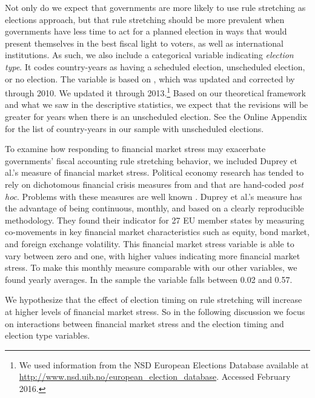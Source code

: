 \documentclass[]{article}
\begin{document}
Not only do we expect that governments are more likely to use rule stretching as elections approach, but that rule stretching should be more prevalent when governments have less time to act for a planned election in ways that would present themselves in the best fiscal light to voters, as well as international institutions. As such, we also include a categorical variable indicating \emph{election type}. It codes country-years as having a scheduled election, unscheduled election, or no election. The variable is based on \cite{Brender2008}, which was updated and corrected by \cite{hallerbergWehner2015} through 2010. We updated it through 2013.\footnote{We used information from the NSD European Elections Database available at \url{http://www.nsd.uib.no/european_election_database}. Accessed February 2016.} Based on our theoretical framework and what we saw in the descriptive statistics, we expect that the revisions will be greater for years when there is an unscheduled election. See the Online Appendix for the list of country-years in our sample with unscheduled elections.

To examine how responding to financial market stress may exacerbate governments' fiscal accounting rule stretching behavior, we included Duprey et al.'s \citeyearpar{ThibautDuprey2015} measure of financial market stress. Political economy research has tended to rely on dichotomous financial crisis measures from \cite{Laeven2012} and \cite{ReinhartRog2010} that are hand-coded \emph{post hoc}. Problems with these measures are well known \citep[see][]{finstress_paper}. Duprey et al.'s measure has the advantage of being continuous, monthly, and based on a clearly reproducible methodology. They found their indicator for 27 EU member states by measuring co-movements in key financial market characteristics such as equity, bond market, and foreign exchange volatility. This financial market stress variable is able to vary between zero and one, with higher values indicating more financial market stress. To make this monthly measure comparable with our other variables, we found yearly averages. In the sample the variable falls between 0.02 and 0.57.

We hypothesize that the effect of election timing on rule stretching will increase at higher levels of financial market stress. So in the following discussion we focus on interactions between financial market stress and the election timing and election type variables.
\end{document}
